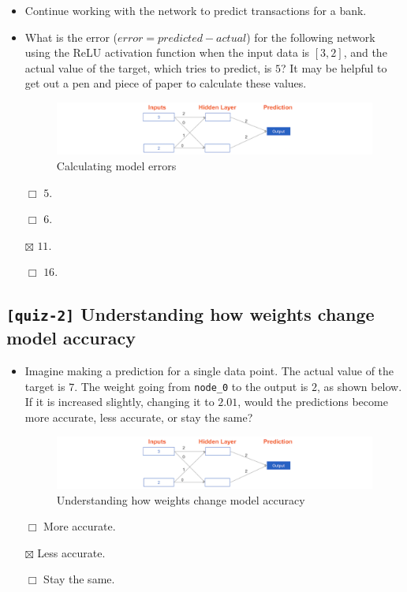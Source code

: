 \documentclass[11pt, twoside]{article}
\begin{document}
\begin{itemize}
\item
  Continue working with the network to predict transactions for a bank.
\item
  What is the error (\(error = predicted - actual\)) for the following
  network using the ReLU activation function when the input data is
  \([3, 2]\), and the actual value of the target, which tries to
  predict, is \(5\)? It may be helpful to get out a pen and piece of
  paper to calculate these values.

  \begin{figure}
  \centering
  \includegraphics{../Figures/4. Calculating model errors.png}
  \caption{Calculating model errors}
  \end{figure}

  \(\Box\) \(5\).

  \(\Box\) \(6\).

  \(\boxtimes\) \(11\).

  \(\Box\) \(16\).
\end{itemize}

    \hypertarget{quiz-2-understanding-how-weights-change-model-accuracy}{%
\subsection{\texorpdfstring{\texttt{{[}quiz-2{]}} Understanding how
weights change model
accuracy}{{[}quiz-2{]} Understanding how weights change model accuracy}}\label{quiz-2-understanding-how-weights-change-model-accuracy}}

\begin{itemize}
\item
  Imagine making a prediction for a single data point. The actual value
  of the target is \(7\). The weight going from \texttt{node\_0} to the
  output is \(2\), as shown below. If it is increased slightly, changing
  it to \(2.01\), would the predictions become more accurate, less
  accurate, or stay the same?

  \begin{figure}
  \centering
  \includegraphics{../Figures/5. Understanding how weights change model accuracy.png}
  \caption{Understanding how weights change model accuracy}
  \end{figure}

  \(\Box\) More accurate.

  \(\boxtimes\) Less accurate.

  \(\Box\) Stay the same.
\end{itemize}
\end{document}
